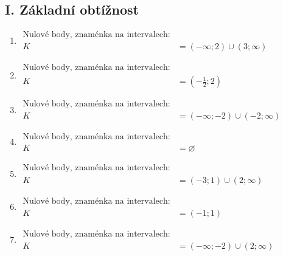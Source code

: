 \documentclass[11pt,a4paper]{article}
\begin{document}
\subsection*{I. Základní obtížnost}
\begin{enumerate}[label={},itemsep=9pt]
\item[\textbf{H001}] \(\displaystyle \begin{aligned}\text{Nulové body, znaménka na intervalech:}\\ K&=(-\infty;2)\cup(3;\infty)\end{aligned}\)\par
\item[\textbf{H004}] \(\displaystyle \begin{aligned}\text{Nulové body, znaménka na intervalech:}\\ K&=(- \frac{1}{2};2)\end{aligned}\)\par
\item[\textbf{H005}] \(\displaystyle \begin{aligned}\text{Nulové body, znaménka na intervalech:}\\ K&=(-\infty;-2)\cup(-2;\infty)\end{aligned}\)\par
\item[\textbf{H006}] \(\displaystyle \begin{aligned}\text{Nulové body, znaménka na intervalech:}\\ K&=\varnothing\end{aligned}\)\par
\item[\textbf{H009}] \(\displaystyle \begin{aligned}\text{Nulové body, znaménka na intervalech:}\\ K&=(-3;1)\cup(2;\infty)\end{aligned}\)\par
\item[\textbf{H011}] \(\displaystyle \begin{aligned}\text{Nulové body, znaménka na intervalech:}\\ K&=(-1;1)\end{aligned}\)\par
\item[\textbf{H012}] \(\displaystyle \begin{aligned}\text{Nulové body, znaménka na intervalech:}\\ K&=(-\infty;-2)\cup(2;\infty)\end{aligned}\)\par

\end{enumerate}
\end{document}
